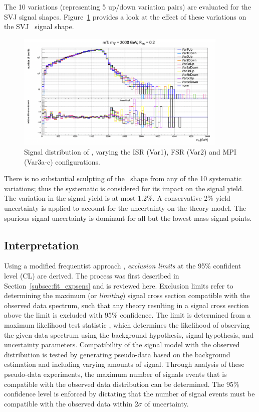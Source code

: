 The 10 variations (representing 5 up/down variation pairs) are evaluated for the SVJ signal shapes. 
Figure~\ref{fig:isrfsr} provides a look at the effect of these variations on the SVJ \mt~signal shape. 

\begin{figure}[!htbp]
\centering
   \includegraphics[width=0.9\textwidth]{figures/systs/isrfsr}
    \caption{Signal distribution of \mt, varying the ISR (Var1), FSR (Var2) and MPI (Var3a-c) configurations.
    \label{fig:isrfsr}}
\end{figure}

There is no substantial sculpting of the \mt~shape from any of the 10 systematic variations; thus the systematic is considered for its impact on the signal yield.
The variation in the signal yield is at most 1.2\%.
A conservative 2\% yield uncertainty is applied to account for the uncertainty on the theory model.
The spurious signal uncertainty is dominant for all but the lowest mass signal points.

\subsection{Interpretation}
Using a modified frequentist approach \cite{freq}, \textit{exclusion limits} at the 95\% confident level (CL) are derived.
The process was first described in Section~\ref{subsec:fit_expsens} and is reviewed here.
Exclusion limits refer to determining the maximum (or \textit{limiting}) signal cross section compatible with the observed data spectrum, such that any theory resulting in a signal cross section above the limit is excluded with 95\% confidence. 
The limit is determined from a maximum likelihood test statistic \cite{likelihood}, which determines the likelihood of observing the given data spectrum using the background hypothesis, signal hypothesis, and uncertainty parameters.
Compatibility of the signal model with the observed distribution is tested by generating pseudo-data based on the background estimation and including varying amounts of signal.
Through analysis of these pseudo-data experiments, the maximum number of signals events that is compatible with the observed data distribution can be determined.
The 95\% confidence level is enforced by dictating that the number of signal events must be compatible with the observed data within 2$\sigma$ of uncertainty.

